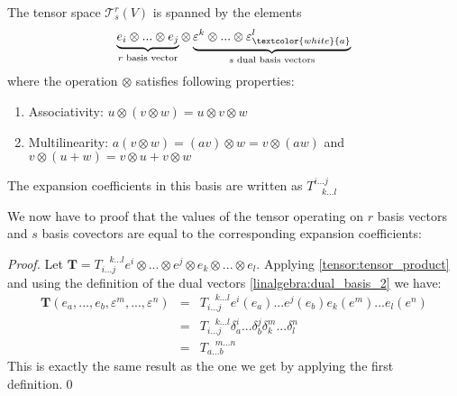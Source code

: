 	\begin{adefinition}\label{tensor:type}
    		The tensor space $\mathcal{T}^r_s(V)$ is spanned by the elements
    		\[\underbrace{e_i\otimes...\otimes e_j}_{r\text{ basis vector}}\otimes\underbrace{\varepsilon^k\otimes...\otimes \varepsilon^l_{\textcolor{white}{a}}}_{s\text{ dual basis vectors}}\]
    		where the operation $\otimes$ satisfies following properties:
        	\begin{enumerate}
        		\item Associativity: $u\otimes(v\otimes w) = u \otimes v\otimes w$
		        \item Multilinearity: $a(v\otimes w) = (av)\otimes w = v\otimes (aw)$ and $v\otimes (u+w) = v\otimes u + v\otimes w$
	        \end{enumerate}
	        The expansion coefficients in this basis are written as $T^{i...j}_{\ \ \ \ k...l}$
	\end{adefinition}

    
    	We now have to proof that the values of the tensor operating on $r$ basis vectors and $s$ basis covectors are equal to the corresponding expansion coefficients:
      	\begin{proof}
        	Let $\mathbf{T} = T_{i...j}^{\ \ \ \ k...l}e^i\otimes...\otimes e^j\otimes e_k\otimes...\otimes e_l$. Applying \ref{tensor:tensor_product} and using the definition of the dual vectors \ref{linalgebra:dual_basis_2} we have:
		\[
            	\begin{array}{ccl}
            		\mathbf{T}(e_a, ..., e_b, \varepsilon^m, ..., \varepsilon^n) &=& T_{i...j}^{\ \ \ \ k...l}e^i(e_a)...e^j(e_b)e_k(e^m)...e_l(e^n)\\
                	&=& T_{i...j}^{\ \ \ \ k...l}\delta_a^i...\delta_b^j\delta_k^m...\delta_l^n\\
                	&=& T_{a...b}^{\ \ \ \ m...n}
	        \end{array}
		\]
		This is exactly the same result as the one we get by applying the first definition.\qed
      	\end{proof}
      	

